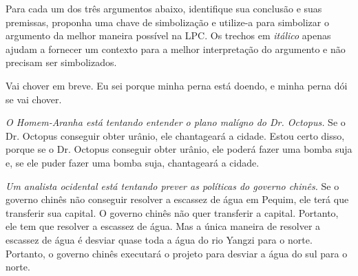 \problempart
Para cada um dos três argumentos abaixo, identifique sua conclusão e suas premissas, proponha uma chave de simbolização e utilize-a para simbolizar o  argumento da melhor maneira possível na LPC.
Os trechos em \emph{itálico} apenas ajudam a fornecer um contexto para a melhor interpretação do argumento e não precisam ser simbolizados.
\begin{earg}
\item Vai chover em breve. Eu sei porque minha perna está doendo, e minha perna dói se vai chover.



\item  \emph{O Homem-Aranha está tentando entender o plano malígno do Dr. Octopus.} Se o Dr. Octopus conseguir obter urânio, ele chantageará a cidade. Estou certo disso, porque se o Dr. Octopus conseguir obter urânio, ele poderá fazer uma bomba suja e, se ele puder fazer uma bomba suja, chantageará a cidade.



\item \emph{Um analista ocidental está tentando prever as políticas do governo chinês.} Se o governo chinês não conseguir resolver a escassez de água em Pequim, ele terá que transferir sua capital. O governo chinês não quer transferir a capital. Portanto, ele tem que resolver a escassez de água. Mas a única maneira de resolver a escassez de água é desviar quase toda a água do rio Yangzi para o norte. Portanto, o governo chinês executará o projeto para desviar a água do sul para o norte.       





\end{earg}

